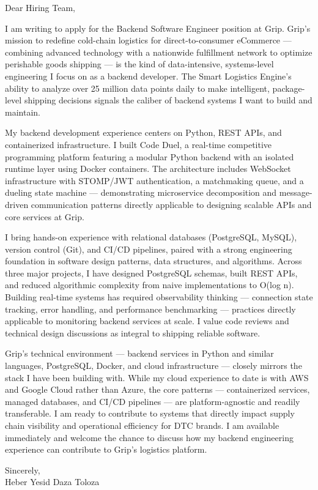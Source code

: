 \documentclass{cover}
\begin{document}
\makeheader
\makesubject

\begin{coverbody}
Dear Hiring Team,

I am writing to apply for the Backend Software Engineer position at Grip. Grip's mission to redefine cold-chain logistics for direct-to-consumer eCommerce --- combining advanced technology with a nationwide fulfillment network to optimize perishable goods shipping --- is the kind of data-intensive, systems-level engineering I focus on as a backend developer. The Smart Logistics Engine's ability to analyze over 25 million data points daily to make intelligent, package-level shipping decisions signals the caliber of backend systems I want to build and maintain.

My backend development experience centers on Python, REST APIs, and containerized infrastructure. I built Code Duel, a real-time competitive programming platform featuring a modular Python backend with an isolated runtime layer using Docker containers. The architecture includes WebSocket infrastructure with STOMP/JWT authentication, a matchmaking queue, and a dueling state machine --- demonstrating microservice decomposition and message-driven communication patterns directly applicable to designing scalable APIs and core services at Grip.

I bring hands-on experience with relational databases (PostgreSQL, MySQL), version control (Git), and CI/CD pipelines, paired with a strong engineering foundation in software design patterns, data structures, and algorithms. Across three major projects, I have designed PostgreSQL schemas, built REST APIs, and reduced algorithmic complexity from naive implementations to O(log n). Building real-time systems has required observability thinking --- connection state tracking, error handling, and performance benchmarking --- practices directly applicable to monitoring backend services at scale. I value code reviews and technical design discussions as integral to shipping reliable software.

Grip's technical environment --- backend services in Python and similar languages, PostgreSQL, Docker, and cloud infrastructure --- closely mirrors the stack I have been building with. While my cloud experience to date is with AWS and Google Cloud rather than Azure, the core patterns --- containerized services, managed databases, and CI/CD pipelines --- are platform-agnostic and readily transferable. I am ready to contribute to systems that directly impact supply chain visibility and operational efficiency for DTC brands. I am available immediately and welcome the chance to discuss how my backend engineering experience can contribute to Grip's logistics platform.

Sincerely,\\[1em]
Heber Yesid Daza Toloza
\end{coverbody}
\end{document}
